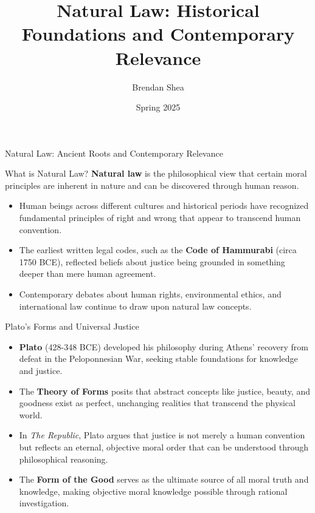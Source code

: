 \documentclass{beamer}
\title{Natural Law: Historical Foundations and Contemporary Relevance}
\author{Brendan Shea}
\date{Spring 2025}
\begin{document}
\begin{frame}
    \titlepage
\end{frame}

\begin{frame}{Natural Law: Ancient Roots and Contemporary Relevance}
    \begin{alertblock}{What is Natural Law?}
        \textbf{Natural law} is the philosophical view that certain moral principles are inherent in nature and can be discovered through human reason.
    \end{alertblock}
    
    \begin{itemize}
        \item Human beings across different cultures and historical periods have recognized fundamental principles of right and wrong that appear to transcend human convention.
        
        \item The earliest written legal codes, such as the \textbf{Code of Hammurabi} (circa 1750 BCE), reflected beliefs about justice being grounded in something deeper than mere human agreement.
        
        \item Contemporary debates about human rights, environmental ethics, and international law continue to draw upon natural law concepts.
    \end{itemize}
\end{frame}

\begin{frame}{Plato's Forms and Universal Justice}
    \begin{itemize}
        \item \textbf{Plato} (428-348 BCE) developed his philosophy during Athens' recovery from defeat in the Peloponnesian War, seeking stable foundations for knowledge and justice.
        
        \item The \textbf{Theory of Forms} posits that abstract concepts like justice, beauty, and goodness exist as perfect, unchanging realities that transcend the physical world.
        
        \item In \textit{The Republic}, Plato argues that justice is not merely a human convention but reflects an eternal, objective moral order that can be understood through philosophical reasoning.
        
        \item The \textbf{Form of the Good} serves as the ultimate source of all moral truth and knowledge, making objective moral knowledge possible through rational investigation.
    \end{itemize}
\end{frame}
\end{document}
